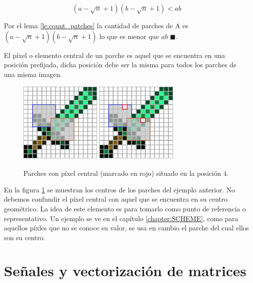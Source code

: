 \begin{equation}
	(a - \sqrt{n} + 1)(b - \sqrt{n} + 1) < ab
	\label{eq:count_patches_ieq}
\end{equation}

Por el lema \ref{le:count_patches} la cantidad de parches de A es $(a - \sqrt{n} + 1)(b - \sqrt{n} + 1)$ lo que es menor que $ab$ $\blacksquare$.

\begin{definition}
	El p\'ixel o elemento central de un parche es aquel que se encuentra en una posici\'on prefijada, dicha posici\'on debe ser la misma para todos los parches de una misma imagen.
\end{definition}

\begin{figure}[h]
	\centering
	\includegraphics[width=4cm, height=4cm]{Graphics/diamon_sword_with_patches.png}
	\hspace{1cm}
	\includegraphics[width=4cm, height=4cm]{Graphics/diamon_sword_with_patches_and_centers.png}
	\caption{Parches con p\'ixel central (marcado en rojo) situado en la posici\'on $4$.}
	\label{ex:patch_center}
\end{figure}

En la figura \ref{ex:patch_center} se muestran los centros de los parches del ejemplo anterior. No debemos confundir el p\'ixel central con aquel que se encuentra en su centro geom\'etrico. La idea de este elemento es para tomarlo como punto de referencia o representativo. Un ejemplo se ve en el cap\'itulo \ref{chapter:SCHEME}, como para aquellos p\'ixles que no se conoce su valor, se usa en cambio el parche del cual ellos son su centro.

\section{Señales y vectorizaci\'on de matrices}\label{sec:signals}


